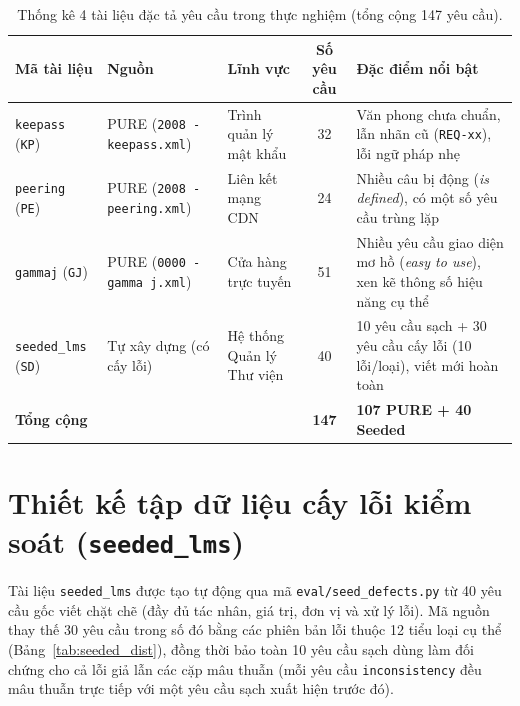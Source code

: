 \documentclass[12pt,a4paper]{report}
\begin{document}
\begin{table}[H]
\centering
\caption{Thống kê 4 tài liệu đặc tả yêu cầu trong thực nghiệm (tổng cộng 147 yêu cầu).}
\label{tab:dataset}
\small
\begin{tabular}{llp{4.5cm}cp{4.4cm}}
\toprule
\textbf{Mã tài liệu} & \textbf{Nguồn} & \textbf{Lĩnh vực} & \textbf{Số yêu cầu} & \textbf{Đặc điểm nổi bật} \\
\midrule
\texttt{keepass} (\texttt{KP}) & PURE (\texttt{2008 - keepass.xml}) & Trình quản lý mật khẩu & 32 & Văn phong chưa chuẩn, lẫn nhãn cũ (\texttt{REQ-xx}), lỗi ngữ pháp nhẹ \\
\texttt{peering} (\texttt{PE}) & PURE (\texttt{2008 - peering.xml}) & Liên kết mạng CDN & 24 & Nhiều câu bị động (\textit{is defined}), có một số yêu cầu trùng lặp \\
\texttt{gammaj} (\texttt{GJ}) & PURE (\texttt{0000 - gamma j.xml}) & Cửa hàng trực tuyến & 51 & Nhiều yêu cầu giao diện mơ hồ (\textit{easy to use}), xen kẽ thông số hiệu năng cụ thể \\
\midrule
\texttt{seeded\_lms} (\texttt{SD}) & Tự xây dựng (có cấy lỗi) & Hệ thống Quản lý Thư viện & 40 & 10 yêu cầu sạch + 30 yêu cầu cấy lỗi (10 lỗi/loại), viết mới hoàn toàn \\
\midrule
\textbf{Tổng cộng} & & & \textbf{147} & \textbf{107 PURE + 40 Seeded} \\
\bottomrule
\end{tabular}
\end{table}

\section{Thiết kế tập dữ liệu cấy lỗi kiểm soát (\texttt{seeded\_lms})}
Tài liệu \texttt{seeded\_lms} được tạo tự động qua mã \texttt{eval/seed\_defects.py} từ 40 yêu cầu gốc viết chặt chẽ (đầy đủ tác nhân, giá trị, đơn vị và xử lý lỗi). Mã nguồn thay thế 30 yêu cầu trong số đó bằng các phiên bản lỗi thuộc 12 tiểu loại cụ thể (Bảng~\ref{tab:seeded_dist}), đồng thời bảo toàn 10 yêu cầu sạch dùng làm đối chứng cho cả lỗi giả lẫn các cặp mâu thuẫn (mỗi yêu cầu \texttt{inconsistency} đều mâu thuẫn trực tiếp với một yêu cầu sạch xuất hiện trước đó).
\end{document}
